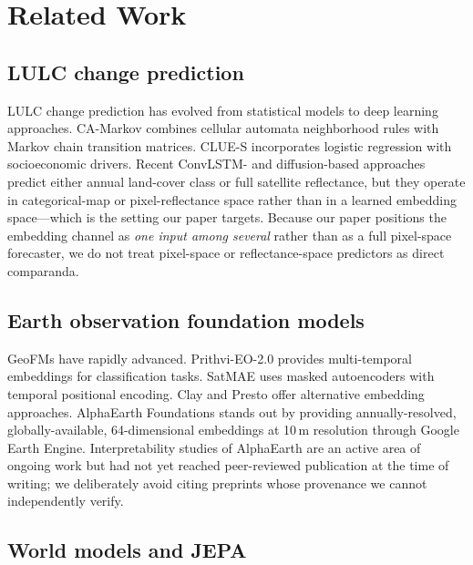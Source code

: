 \documentclass{article}
\begin{document}
\section{Related Work}
\label{sec:related}

\subsection{LULC change prediction}

LULC change prediction has evolved from statistical models to deep learning approaches. CA-Markov \citep{veldkamp2004clues} combines cellular automata neighborhood rules with Markov chain transition matrices. CLUE-S \citep{verburg2002clues} incorporates logistic regression with socioeconomic drivers. Recent ConvLSTM- and diffusion-based approaches predict either annual land-cover class or full satellite reflectance, but they operate in categorical-map or pixel-reflectance space rather than in a learned embedding space---which is the setting our paper targets. Because our paper positions the embedding channel as \textit{one input among several} rather than as a full pixel-space forecaster, we do not treat pixel-space or reflectance-space predictors as direct comparanda.

\subsection{Earth observation foundation models}

GeoFMs have rapidly advanced. Prithvi-EO-2.0 \citep{jakubik2024prithvi} provides multi-temporal embeddings for classification tasks. SatMAE \citep{cong2022satmae} uses masked autoencoders with temporal positional encoding. Clay and Presto offer alternative embedding approaches. AlphaEarth Foundations \citep{brown2025alphaearth} stands out by providing annually-resolved, globally-available, 64-dimensional embeddings at 10\,m resolution through Google Earth Engine. Interpretability studies of AlphaEarth are an active area of ongoing work but had not yet reached peer-reviewed publication at the time of writing; we deliberately avoid citing preprints whose provenance we cannot independently verify.

\subsection{World models and JEPA}
\end{document}
